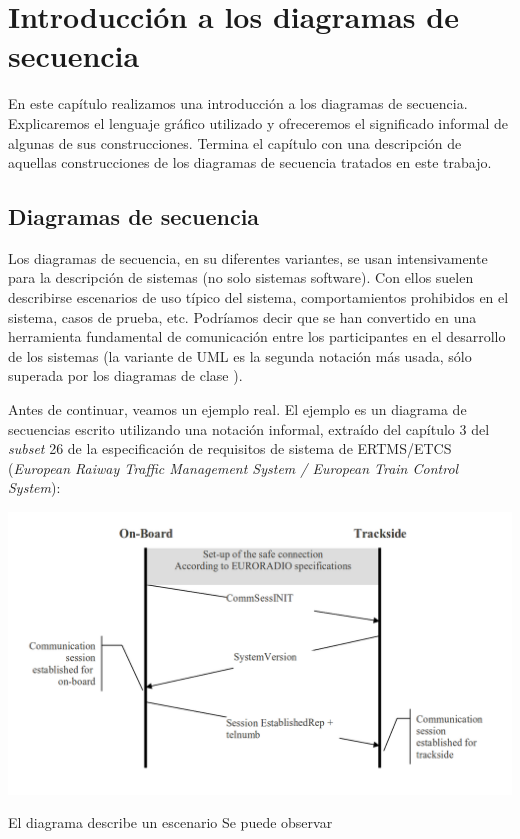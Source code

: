 \chapter{Introducción a los diagramas de secuencia}
\label{ch:msc}

En este capítulo realizamos una introducción a los diagramas de
secuencia. Explicaremos el lenguaje gráfico utilizado y ofreceremos el
significado informal de algunas de sus construcciones. Termina el
capítulo con una descripción de aquellas construcciones de los
diagramas de secuencia tratados en este trabajo.

\section{Diagramas de secuencia}
Los diagramas de secuencia, en su diferentes variantes, se usan
intensivamente para la descripción de sistemas (no solo sistemas
software). Con ellos suelen describirse escenarios de uso típico del
sistema, comportamientos prohibidos en el sistema, casos de prueba,
etc. Podríamos decir que se han convertido en una herramienta
fundamental de comunicación entre los participantes en el desarrollo
de los sistemas (la variante de UML es la segunda notación más usada,
sólo superada por los diagramas de clase
\cite{Dobing:2006:UU:1125944.1125949}).

Antes de continuar, veamos un ejemplo real. El ejemplo es un diagrama
de secuencias escrito utilizando una notación informal, extraído del
capítulo 3 del \emph{subset} 26 de la especificación de requisitos de
sistema de ERTMS/ETCS (\emph{European Raiway Traffic Management System /
  European Train Control System}):
\begin{center}
  \includegraphics[width=0.9\linewidth]{images/ejemplo-ertms}
\end{center}
El diagrama describe un escenario Se puede observar 


